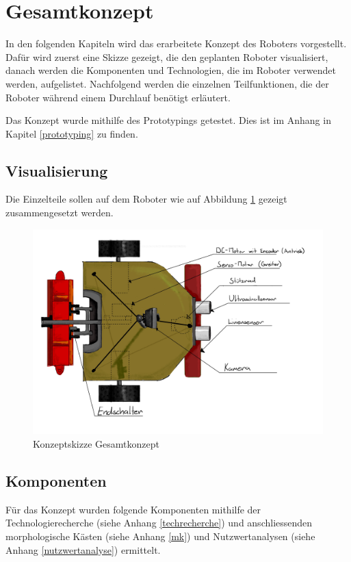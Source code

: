 \section{Gesamtkonzept}

In den folgenden Kapiteln wird das erarbeitete Konzept des Roboters vorgestellt. Dafür wird zuerst eine Skizze gezeigt, die den geplanten Roboter visualisiert, danach werden die Komponenten und Technologien, die im Roboter verwendet werden, aufgelistet. Nachfolgend werden die einzelnen Teilfunktionen, die der Roboter während einem Durchlauf benötigt erläutert. 

Das Konzept wurde mithilfe des Prototypings getestet. Dies ist im Anhang in Kapitel \ref{prototyping} zu finden.

\subsection{Visualisierung}

Die Einzelteile sollen auf dem Roboter wie auf Abbildung \ref{fig:robot_concept-scetch_labeld} gezeigt zusammengesetzt werden.

\begin{figure}[H]
\centering
\includegraphics[width=\textwidth]{assets/gesamtkonzept/Skizze-Fahrzeugkonzept-Beschriftet.jpg}
\caption{Konzeptskizze Gesamtkonzept}
\label{fig:robot_concept-scetch_labeld}
\end{figure}

\subsection{Komponenten}
Für das Konzept wurden folgende Komponenten mithilfe der Technologierecherche (siehe Anhang \ref{techrecherche}) und anschliessenden morphologische Kästen (siehe Anhang \ref{mk}) und Nutzwertanalysen (siehe Anhang \ref{nutzwertanalyse}) ermittelt. 


